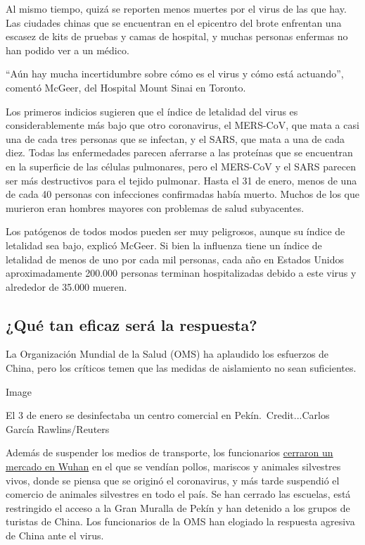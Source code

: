 Al mismo tiempo, quizá se reporten menos muertes por el virus de las que
hay. Las ciudades chinas que se encuentran en el epicentro del brote
enfrentan una escasez de kits de pruebas y camas de hospital, y muchas
personas enfermas no han podido ver a un médico.

``Aún hay mucha incertidumbre sobre cómo es el virus y cómo está
actuando'', comentó McGeer, del Hospital Mount Sinai en Toronto.

Los primeros indicios sugieren que el índice de letalidad del virus es
considerablemente más bajo que otro coronavirus, el MERS-CoV, que mata a
casi una de cada tres personas que se infectan, y el SARS, que mata a
una de cada diez. Todas las enfermedades parecen aferrarse a las
proteínas que se encuentran en la superficie de las células pulmonares,
pero el MERS-CoV y el SARS parecen ser más destructivos para el tejido
pulmonar. Hasta el 31 de enero, menos de una de cada 40 personas con
infecciones confirmadas había muerto. Muchos de los que murieron eran
hombres mayores con problemas de salud subyacentes.

Los patógenos de todos modos pueden ser muy peligrosos, aunque su índice
de letalidad sea bajo, explicó McGeer. Si bien la influenza tiene un
índice de letalidad de menos de uno por cada mil personas, cada año en
Estados Unidos aproximadamente 200.000 personas terminan hospitalizadas
debido a este virus y alrededor de 35.000 mueren.

\hypertarget{quuxe9-tan-eficaz-seruxe1-la-respuesta}{%
\subsection{¿Qué tan eficaz será la
respuesta?}\label{quuxe9-tan-eficaz-seruxe1-la-respuesta}}

La Organización Mundial de la Salud (OMS) ha aplaudido los esfuerzos de
China, pero los críticos temen que las medidas de aislamiento no sean
suficientes.

Image

El 3 de enero se desinfectaba un centro comercial en
Pekín.~Credit...Carlos García Rawlins/Reuters

Además de suspender los medios de transporte, los funcionarios
\href{https://www.nytimes.com/es/2020/01/27/espanol/coronavirus-murcielago.html}{cerraron
un mercado en Wuhan} en el que se vendían pollos, mariscos y animales
silvestres vivos, donde se piensa que se originó el coronavirus, y más
tarde suspendió el comercio de animales silvestres en todo el país. Se
han cerrado las escuelas, está restringido el acceso a la Gran Muralla
de Pekín y han detenido a los grupos de turistas de China. Los
funcionarios de la OMS han elogiado la respuesta agresiva de China ante
el virus.

